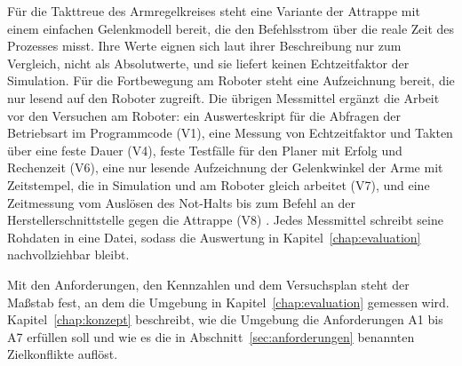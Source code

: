 Für die Takttreue des Armregelkreises steht eine Variante der Attrappe mit einem einfachen Gelenkmodell bereit, die den Befehlsstrom über die reale Zeit des Prozesses misst.
Ihre Werte eignen sich laut ihrer Beschreibung nur zum Vergleich, nicht als Absolutwerte, und sie liefert keinen Echtzeitfaktor der Simulation.
Für die Fortbewegung am Roboter steht eine Aufzeichnung bereit, die nur lesend auf den Roboter zugreift.
Die übrigen Messmittel ergänzt die Arbeit vor den Versuchen am Roboter: ein Auswerteskript für die Abfragen der Betriebsart im Programmcode (V1), eine Messung von Echtzeitfaktor und Takten über eine feste Dauer (V4), feste Testfälle für den Planer mit Erfolg und Rechenzeit (V6), eine nur lesende Aufzeichnung der Gelenkwinkel der Arme mit Zeitstempel, die in Simulation und am Roboter gleich arbeitet (V7), und eine Zeitmessung vom Auslösen des Not-Halts bis zum Befehl an der Herstellerschnittstelle gegen die Attrappe (V8) .
Jedes Messmittel schreibt seine Rohdaten in eine Datei, sodass die Auswertung in Kapitel~\ref{chap:evaluation} nachvollziehbar bleibt.

Mit den Anforderungen, den Kennzahlen und dem Versuchsplan steht der Maßstab fest, an dem die Umgebung in Kapitel~\ref{chap:evaluation} gemessen wird.
Kapitel~\ref{chap:konzept} beschreibt, wie die Umgebung die Anforderungen A1 bis A7 erfüllen soll und wie es die in Abschnitt~\ref{sec:anforderungen} benannten Zielkonflikte auflöst.
